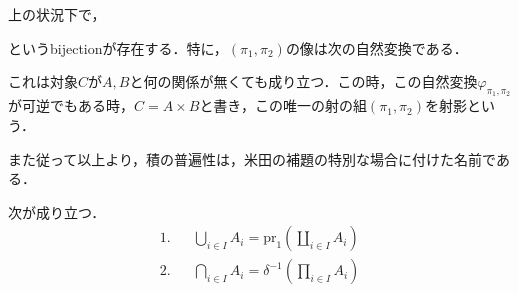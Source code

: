 \documentclass[uplatex, 12pt, dvipdfmx]{jsreport}
\begin{document}
\begin{remark}
    上の状況下で，
    \begin{center}\end{center}
    というbijectionが存在する．特に，$(\pi_1,\pi_2)$の像は次の自然変換である．
    \begin{center}\end{center}
    これは対象$C$が$A,B$と何の関係が無くても成り立つ．この時，この自然変換$\varphi_{\pi_1,\pi_2}$が可逆でもある時，$C=A\times B$と書き，この唯一の射の組$(\pi_1,\pi_2)$を射影という．

    また従って以上より，積の普遍性は，米田の補題の特別な場合に付けた名前である．
\end{remark}

\begin{proposition}[集合の和と積との関係]
    次が成り立つ．
    \begin{align*}
        1.&& \bigcup_{i\in I}A_i = \mathrm{pr}_1(\coprod_{i\in I}A_i)\\
        2.&& \bigcap_{i\in I}A_i = \delta^{-1}(\prod_{i\in I}A_i)
    \end{align*}    
\end{proposition}
\end{document}
